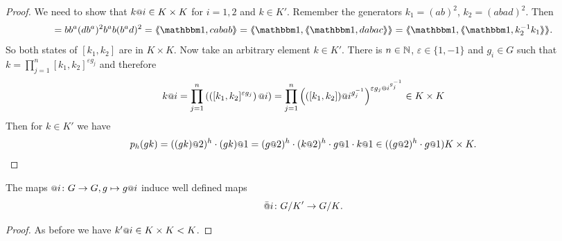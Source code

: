 \documentclass[a4paper,11pt]{amsart}
\begin{document}
\begin{proof}
We need to show that $k\at{i} \in K\times K$ for $i=1,2$ and $k\in K'$. Remember the generators $k_1=(ab)^2$, $k_2=(abad)^2$. Then 
\begin{align*}
 [k_1,k_2]=bb^a(db^a)^2b^ab(b^ad)^2 = \pair{\id,cabab}=\pair{\id,\pair{\id,dabac}}=\pair{\id,\pair{\id,k_2^{-1}k_1}}.
\end{align*}
So both states of $[k_1,k_2]$ are in $K\times K$. Now take an arbitrary element $k\in K'$.
There is $n\in\mathbb{N}$, $\varepsilon \in \{1,-1\}$ and $g_i\in G$ such that 
$k=\prod_{j=1}^n [k_1,k_2]^{\varepsilon g_j}$
and therefore 
\[k\at{i}=\prod_{j=1}^n\left( \left([k_1,k_2]^{\varepsilon g_j}\right)\at{i}\right)
	 = \prod_{j=1}^n \left(([k_1,k_2])\at{i^{g_j^{-1}}}\right)^{\varepsilon g_j\at{i^{g_j^{-1}}}}\in K\times K\]
 Then for $k\in K'$ we have
 \[p_h(gk) = ((gk)\at{2})^h\cdot (gk)\at{1} = (g\at{2})^h\cdot (k\at{2})^h\cdot g\at{1}\cdot k\at{1}\in ((g\at{2})^h\cdot g\at{1})K\times K.\]
\end{proof}
\begin{lem} \label{lem:atIsWellDefinedModK'}
 The maps $\at{i}\colon G\to G, g\mapsto g\at{i}$ induce well defined maps \[\att{i}\colon \RNK{G}{K'}\to\RNK{G}{K}.\]
\end{lem}
\begin{proof}
 As before we have $k'\at{i} \in K\times K < K$.
%  
%  
% 
\end{proof}
\end{document}
